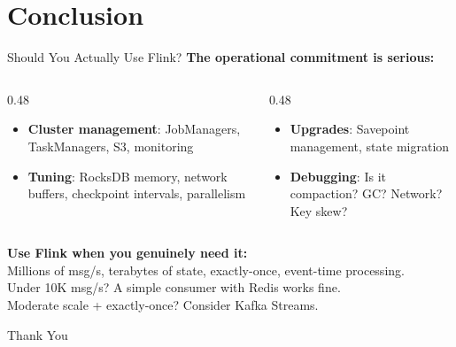 \documentclass[aspectratio=169]{beamer}
\begin{document}
\section{Conclusion}

\begin{frame}{Should You Actually Use Flink?}
    \textbf{The operational commitment is serious:}
    \vspace{0.2cm}

    \begin{columns}[T]
        \begin{column}{0.48\textwidth}
            \begin{itemize}
                \item \textbf{Cluster management}: JobManagers, TaskManagers, S3, monitoring
                \item \textbf{Tuning}: RocksDB memory, network buffers, checkpoint intervals, parallelism
            \end{itemize}
        \end{column}
        \begin{column}{0.48\textwidth}
            \begin{itemize}
                \item \textbf{Upgrades}: Savepoint management, state migration
                \item \textbf{Debugging}: Is it compaction? GC? Network? Key skew?
            \end{itemize}
        \end{column}
    \end{columns}

    \vspace{0.4cm}
    \colorbox{utu_green!20}{\parbox{0.95\textwidth}{
        \centering
        \vspace{0.1cm}
        \textbf{Use Flink when you genuinely need it:}\\
        Millions of msg/s, terabytes of state, exactly-once, event-time processing.\\
        \vspace{0.1cm}
        Under 10K msg/s? A simple consumer with Redis works fine.\\
        Moderate scale + exactly-once? Consider Kafka Streams.
        \vspace{0.1cm}
    }}
\end{frame}

\begin{frame}
    \begin{center}
        {\Huge\calligra Thank You}
    \end{center}
\end{frame}
\end{document}
